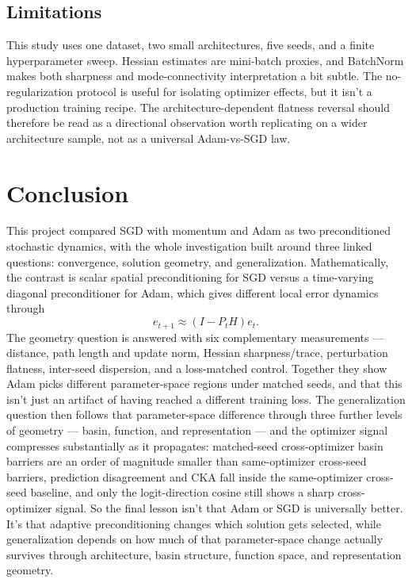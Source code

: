 \documentclass[11pt]{article}
\begin{document}
\subsection{Limitations}
\label{sec:limitations}

This study uses one dataset, two small architectures, five seeds, and a finite hyperparameter sweep. Hessian estimates are mini-batch proxies, and BatchNorm makes both sharpness and mode-connectivity interpretation a bit subtle. The no-regularization protocol is useful for isolating optimizer effects, but it isn't a production training recipe. The architecture-dependent flatness reversal should therefore be read as a directional observation worth replicating on a wider architecture sample, not as a universal Adam-vs-SGD law.

\section{Conclusion}

This project compared SGD with momentum and Adam as two preconditioned stochastic dynamics, with the whole investigation built around three linked questions: convergence, solution geometry, and generalization. Mathematically, the contrast is scalar spatial preconditioning for SGD versus a time-varying diagonal preconditioner for Adam, which gives different local error dynamics through
\[
e_{t+1}\approx (I-P_tH)e_t.
\]
The geometry question is answered with six complementary measurements --- distance, path length and update norm, Hessian sharpness/trace, perturbation flatness, inter-seed dispersion, and a loss-matched control. Together they show Adam picks different parameter-space regions under matched seeds, and that this isn't just an artifact of having reached a different training loss. The generalization question then follows that parameter-space difference through three further levels of geometry --- basin, function, and representation --- and the optimizer signal compresses substantially as it propagates: matched-seed cross-optimizer basin barriers are an order of magnitude smaller than same-optimizer cross-seed barriers, prediction disagreement and CKA fall inside the same-optimizer cross-seed baseline, and only the logit-direction cosine still shows a sharp cross-optimizer signal. So the final lesson isn't that Adam or SGD is universally better. It's that adaptive preconditioning changes which solution gets selected, while generalization depends on how much of that parameter-space change actually survives through architecture, basin structure, function space, and representation geometry.
\end{document}
